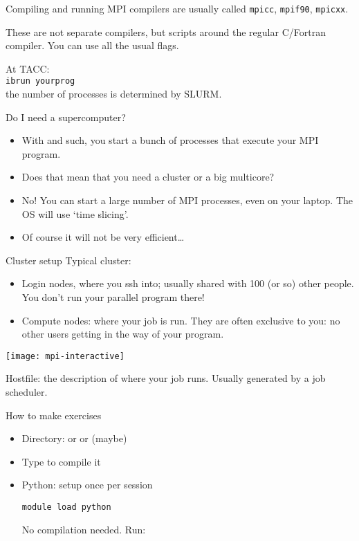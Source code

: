 \begin{frame}[containsverbatim]{Compiling and running}
  MPI compilers are usually called \texttt{mpicc},
  \texttt{mpif90}, \texttt{mpicxx}.

  These are not separate compilers,
  but scripts around the regular C/Fortran compiler. You can use all
  the usual flags.

  At TACC:\\
  \verb+ibrun yourprog+\\
  the number of processes is determined by SLURM.
\end{frame}

\begin{frame}[containsverbatim]{Do I need a supercomputer?}
  \begin{itemize}
  \item With  and such, you start a bunch of processes that
    execute your MPI program.
  \item Does that mean that you need a cluster or a big multicore?
  \item No! You can start a large number of MPI processes, even on
    your laptop. The OS will use `time slicing'.
  \item Of course it will not be very efficient\ldots
  \end{itemize}
\end{frame}

\begin{frame}{Cluster setup}
  \small
  Typical cluster:
  \begin{itemize}
  \item Login nodes, where you ssh into; usually shared with 100 (or
    so) other people. You don't run your parallel program there!
  \item Compute nodes: where your job is run. They are often exclusive
    to you: no other users getting in the way of your program.
  \end{itemize}
  \texttt{[image: mpi-interactive]}

  Hostfile: the description of where your job runs. Usually generated
  by a job scheduler.
\end{frame}

\begin{frame}[containsverbatim]{How to make exercises}
  \begin{itemize}
  \item Directory:  or  or (maybe) 
  \item Type  to compile it
  \item Python: setup once per session
\begin{verbatim}
module load python
\end{verbatim}
    No compilation needed. Run:\\ 
  \end{itemize}
\end{frame}

